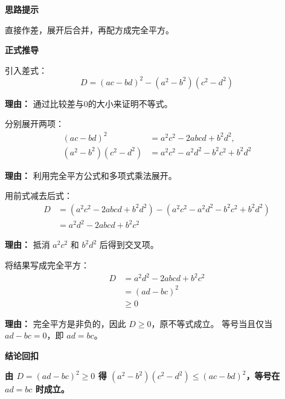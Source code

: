 \begin{proofbox}
	\textbf{\textcolor{CProof}{思路提示}}

	直接作差，展开后合并，再配方成完全平方。

	\medskip
	\textbf{\textcolor{CProof}{正式推导}}
	\begin{description}[style=nextline, leftmargin=2.8em, labelsep=0.5em, itemsep=0.55em]
		\item[\textbf{步骤一（移项作差）：}] 引入差式：
			\[
				D = (ac-bd)^2 - (a^2-b^2)(c^2-d^2)
			\]
			\par\textbf{理由：}
			通过比较差与0的大小来证明不等式。

		\item[\textbf{步骤二（展开计算）：}] 分别展开两项：
			\[
				\begin{aligned}
					(ac-bd)^2 &= a^2c^2 - 2abcd + b^2d^2,\\
					(a^2-b^2)(c^2-d^2) &= a^2c^2 - a^2d^2 - b^2c^2 + b^2d^2
			\end{aligned}
			\]
			\par\textbf{理由：}
			利用完全平方公式和多项式乘法展开。

		\item[\textbf{步骤三（合并化简）：}] 用前式减去后式：
			\[
				\begin{aligned}
					D &= (a^2c^2 - 2abcd + b^2d^2) - (a^2c^2 - a^2d^2 - b^2c^2 + b^2d^2)\\
					&= a^2d^2 - 2abcd + b^2c^2
			\end{aligned}
			\]
			\par\textbf{理由：}
			抵消 $a^2c^2$ 和 $b^2d^2$ 后得到交叉项。

		\item[\textbf{步骤四（配方定号）：}] 将结果写成完全平方：
			\[
				\begin{aligned}
					D &= a^2d^2 - 2abcd + b^2c^2 \\\
					&= (ad-bc)^2 \\\
					&\ge 0
			\end{aligned}
			\]
			\par\textbf{理由：}
			完全平方是非负的，因此 $D\ge0$，原不等式成立。
			等号当且仅当 $ad-bc=0$，即 $ad=bc$。
	\end{description}

	\medskip
	\textbf{\textcolor{CProof}{结论回扣}}

	\textbf{由 $D=(ad-bc)^2\ge0$ 得 $(a^2-b^2)(c^2-d^2)\leqslant(ac-bd)^2$，等号在 $ad=bc$ 时成立。}
\end{proofbox}
